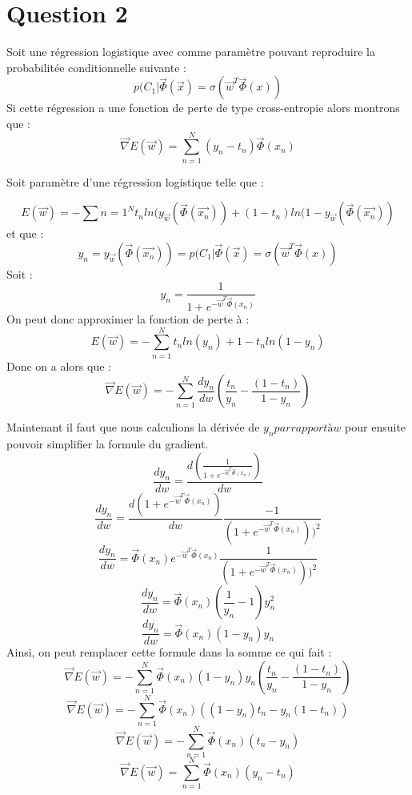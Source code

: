 \documentclass{article}
\begin{document}
\section{Question 2}
Soit une régression logistique avec comme paramètre  pouvant reproduire la probabilitée conditionnelle suivante :
\[p( C_{1} | \overrightarrow{\Phi} (\overrightarrow{x}) = \sigma( \overrightarrow{w}^T \overrightarrow{\Phi}(x)) \]
Si cette régression a une fonction de perte de type cross-entropie alors montrons que :
\[\overrightarrow{\nabla}E(\overrightarrow{w})= \sum_{n=1}^{N}(y_{n} - t_{n})\overrightarrow{\Phi}(x_{n})\]

Soit  paramètre d'une régression logistique telle que :

\[E(\overrightarrow{w})= - \sum{n=1}^{N} t_{n} ln( y_{\overrightarrow{w}}(\overrightarrow{\Phi}(\overrightarrow{x_{n}}))  +  (1-t_{n}) ln(1- y_{\overrightarrow{w}}(\overrightarrow{\Phi}(\overrightarrow{x_{n}}))\]
et que :
\[y_{n} =y_{\overrightarrow{w}}(\overrightarrow{\Phi}(\overrightarrow{x_{n}}))=p( C_{1} | \overrightarrow{\Phi} (\overrightarrow{x}) = \sigma( \overrightarrow{w}^T \overrightarrow{\Phi}(x))  \]
Soit :
\[y_{n} = \frac{1}{1+ e^{-\overrightarrow{w}^T \overrightarrow{\Phi}(x_{n})} }\]
On peut donc approximer la fonction de perte à :
\[E(\overrightarrow{w})= -\sum_{n=1}^{N}t_{n}ln(y_{n}) + 1-t_{n}ln(1-y_{n})\]
Donc on a alors que :
\[\overrightarrow{\nabla}E(\overrightarrow{w})=-\sum_{n=1}^{N} \frac{dy_{n}}{dw}(\frac{t_{n}}{y_{n}} - \frac{(1-t_{n})}{1-y_{n}} )\]

Maintenant il faut que nous calculions la dérivée de $y_{n} par rapport à w$ pour ensuite pouvoir simplifier la formule du gradient.
\[\frac{dy_{n}}{dw}= \frac{d( \frac{1}{1+ e^{-\overrightarrow{w}^T \overrightarrow{\Phi}(x_{n})} })}{dw}\]
\[\frac{dy_{n}}{dw}= \frac{d( 1+ e^{-\overrightarrow{w}^T \overrightarrow{\Phi}(x_{n})})}{dw}\frac{-1}{(1+ e^{-\overrightarrow{w}^T \overrightarrow{\Phi}(x_{n})}))^2}\]
\[\frac{dy_{n}}{dw}=  \overrightarrow{\Phi}(x_{n})e^{-\overrightarrow{w}^T \overrightarrow{\Phi}(x_{n})}\frac{1}{(1+ e^{-\overrightarrow{w}^T \overrightarrow{\Phi}(x_{n})}))^2}\]
\[\frac{dy_{n}}{dw}=\overrightarrow{\Phi}(x_{n})( \frac{1}{y_{n}} -1)y_{n}^2\]
\[\frac{dy_{n}}{dw}=\overrightarrow{\Phi}(x_{n})(1-y_{n})y_{n}\]
Ainsi, on peut remplacer cette formule dans la somme ce qui fait :
\[\overrightarrow{\nabla}E(\overrightarrow{w})=-\sum_{n=1}^{N} \overrightarrow{\Phi}(x_{n})(1-y_{n})y_{n}(\frac{t_{n}}{y_{n}} - \frac{(1-t_{n})}{1-y_{n}} )\]
\[\overrightarrow{\nabla}E(\overrightarrow{w})=-\sum_{n=1}^{N} \overrightarrow{\Phi}(x_{n})((1-y_{n})t_{n}- y_{n}(1-t_{n}) )\]
\[\overrightarrow{\nabla}E(\overrightarrow{w})=-\sum_{n=1}^{N} \overrightarrow{\Phi}(x_{n})(t_{n}- y_{n})\]
\[\overrightarrow{\nabla}E(\overrightarrow{w})=\sum_{n=1}^{N} \overrightarrow{\Phi}(x_{n})( y_{n}- t_{n})\]
\end{document}
